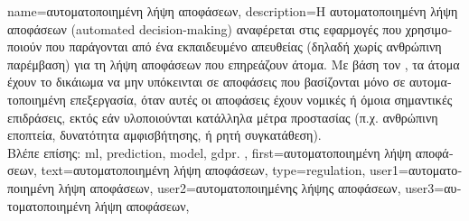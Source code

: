 {name={\foreignlanguage{greek}{αυτοματοποιημένη λήψη αποφάσεων}},
	description={\foreignlanguage{greek}{Η αυτοματοποιημένη λήψη 
		αποφάσεων}
		(automated decision-making) \foreignlanguage{greek}{αναφέρεται στις εφαρμογές} 
		 \foreignlanguage{greek}{που χρησιμοποιούν}  
		\foreignlanguage{greek}{που παράγονται από ένα εκπαιδευμένο}  
		\foreignlanguage{greek}{απευθείας (δηλαδή χωρίς ανθρώπινη παρέμβαση) για τη
		λήψη αποφάσεων που επηρεάζουν άτομα. Με βάση τον} , 
		\foreignlanguage{greek}{τα άτομα έχουν το δικάιωμα να μην υπόκεινται σε αποφάσεις 
		που βασίζονται μόνο σε αυτοματοποιημένη επεξεργασία, όταν αυτές οι αποφάσεις  
		έχουν νομικές ή όμοια σημαντικές επιδράσεις, εκτός εάν υλοποιούνται κατάλληλα μέτρα 
		προστασίας (π.χ. ανθρώπινη εποπτεία, δυνατότητα αμφισβήτησης, ή ρητή συγκατάθεση).}
		\\
		\foreignlanguage{greek}{Βλέπε επίσης:} \gls{ml}, \gls{prediction}, \gls{model}, \gls{gdpr}. }, 
	first={\foreignlanguage{greek}{αυτοματοποιημένη λήψη αποφάσεων}},
	text={\foreignlanguage{greek}{αυτοματοποιημένη λήψη αποφάσεων}},
	type=regulation,
	user1={\foreignlanguage{greek}{αυτοματοποιημένη λήψη αποφάσεων}}, %
	user2={\foreignlanguage{greek}{αυτοματοποιημένης λήψης αποφάσεων}}, %
	user3={\foreignlanguage{greek}{αυτοματοποιημένη λήψη αποφάσεων}}, %
}


